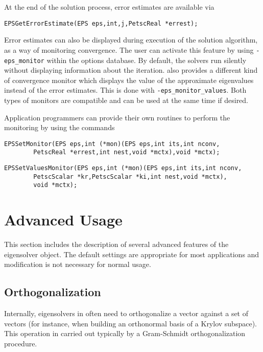 	At the end of the solution process, error estimates are available via
	\begin{Verbatim}[fontsize=\small]
	EPSGetErrorEstimate(EPS eps,int,j,PetscReal *errest);
	\end{Verbatim}

	Error estimates can also be displayed during execution of the solution algorithm, as a way of monitoring convergence. The user can activate this feature by using \Verb!-eps_monitor! within the options database. By default, the solvers run silently without displaying information about the iteration. \slepc also provides a different kind of convergence monitor which displays the value of the approximate eigenvalues instead of the error estimates. This is done with \Verb!-eps_monitor_values!. Both types of monitors are compatible and can be used at the same time if desired.

	Application programmers can provide their own routines to perform the monitoring by using the commands
	 
	\begin{Verbatim}[fontsize=\small]
	EPSSetMonitor(EPS eps,int (*mon)(EPS eps,int its,int nconv,
		PetscReal *errest,int nest,void *mctx),void *mctx);
	\end{Verbatim}
	\begin{Verbatim}[fontsize=\small]
	EPSSetValuesMonitor(EPS eps,int (*mon)(EPS eps,int its,int nconv,
		PetscScalar *kr,PetscScalar *ki,int nest,void *mctx),
		void *mctx);
	\end{Verbatim}

\section{Advanced Usage}

	This section includes the description of several advanced features of the eigensolver object. The default settings are appropriate for most applications and modification is not necessary for normal usage.

\subsection{Orthogonalization}

	Internally, eigensolvers in  often need to orthogonalize a vector against a set of vectors (for instance, when building an orthonormal basis of a Krylov subspace). This operation in carried out typically by a Gram-Schmidt orthogonalization procedure.

